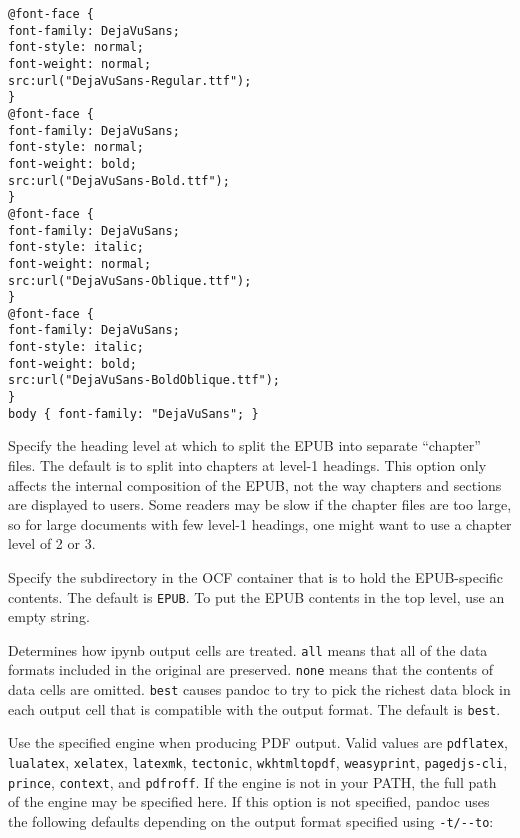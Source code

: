 \begin{description}
\begin{verbatim}
@font-face {
font-family: DejaVuSans;
font-style: normal;
font-weight: normal;
src:url("DejaVuSans-Regular.ttf");
}
@font-face {
font-family: DejaVuSans;
font-style: normal;
font-weight: bold;
src:url("DejaVuSans-Bold.ttf");
}
@font-face {
font-family: DejaVuSans;
font-style: italic;
font-weight: normal;
src:url("DejaVuSans-Oblique.ttf");
}
@font-face {
font-family: DejaVuSans;
font-style: italic;
font-weight: bold;
src:url("DejaVuSans-BoldOblique.ttf");
}
body { font-family: "DejaVuSans"; }
\end{verbatim}
\item[\texttt{-\/-epub-chapter-level=}\emph{NUMBER}]
Specify the heading level at which to split the EPUB into separate
``chapter'' files. The default is to split into chapters at level-1
headings. This option only affects the internal composition of the EPUB,
not the way chapters and sections are displayed to users. Some readers
may be slow if the chapter files are too large, so for large documents
with few level-1 headings, one might want to use a chapter level of 2 or
3.
\item[\texttt{-\/-epub-subdirectory=}\emph{DIRNAME}]
Specify the subdirectory in the OCF container that is to hold the
EPUB-specific contents. The default is \texttt{EPUB}. To put the EPUB
contents in the top level, use an empty string.
\item[\texttt{-\/-ipynb-output=all\textbar{}none\textbar{}best}]
Determines how ipynb output cells are treated. \texttt{all} means that
all of the data formats included in the original are preserved.
\texttt{none} means that the contents of data cells are omitted.
\texttt{best} causes pandoc to try to pick the richest data block in
each output cell that is compatible with the output format. The default
is \texttt{best}.
\item[\texttt{-\/-pdf-engine=}\emph{PROGRAM}]
Use the specified engine when producing PDF output. Valid values are
\texttt{pdflatex}, \texttt{lualatex}, \texttt{xelatex},
\texttt{latexmk}, \texttt{tectonic}, \texttt{wkhtmltopdf},
\texttt{weasyprint}, \texttt{pagedjs-cli}, \texttt{prince},
\texttt{context}, and \texttt{pdfroff}. If the engine is not in your
PATH, the full path of the engine may be specified here. If this option
is not specified, pandoc uses the following defaults depending on the
output format specified using \texttt{-t/-\/-to}:


\end{description}
